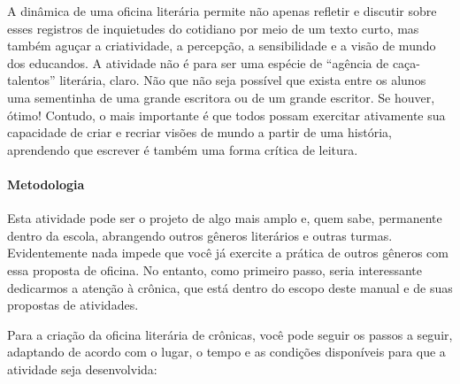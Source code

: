 \documentclass[12pt]{extarticle}
\begin{document}
A dinâmica de uma oficina literária permite não apenas refletir e
discutir sobre esses registros de inquietudes do cotidiano por meio de
um texto curto, mas também aguçar a criatividade, a percepção, a
sensibilidade e a visão de mundo dos educandos. A atividade não é para
ser uma espécie de ``agência de caça-talentos'' literária, claro. Não que
não seja possível que exista entre os alunos uma sementinha de uma
grande escritora ou de um grande escritor. Se houver, ótimo! Contudo, o
mais importante é que todos possam exercitar ativamente sua capacidade
de criar e recriar visões de mundo a partir de uma história, aprendendo
que escrever é também uma forma crítica de leitura.

\paragraph{Metodologia} Esta atividade pode ser o projeto de algo mais
amplo e, quem sabe, permanente dentro da escola, abrangendo outros
gêneros literários e outras turmas. Evidentemente nada impede que você
já exercite a prática de outros gêneros com essa proposta de oficina. No
entanto, como primeiro passo, seria interessante dedicarmos a atenção à
crônica, que está dentro do escopo deste manual e de suas propostas de
atividades.

Para a criação da oficina literária de crônicas, você pode seguir os
passos a seguir, adaptando de acordo com o lugar, o tempo e as condições
disponíveis para que a atividade seja desenvolvida:
\end{document}
